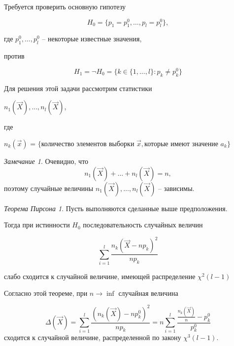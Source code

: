 \documentclass[a4paper, 12pt]{article}
\theoremstyle{definition}
\theoremstyle{leads}
\theoremstyle{example}
\theoremstyle{remark}
\newtheorem{remark}{Замечание}
\begin{document}
Требуется проверить основную гипотезу

\begin{equation*}
	H_0 = \{p_1 = p_1^0, \dots, p_l = p_l^0\}, 
\end{equation*}

где $p_1^0, \dots, p_l^0$ -- некоторые известные значения,

против

\begin{equation*}
	H_1 = \neg H_0 = \{k \in \{1, \dots, l\} : p_k \neq p_k^0\} 
\end{equation*}

Для решения этой задачи рассмотрим статистики
\begin{center}
	\centering
	$n_1(\vec{X}), \dots, n_l(\vec{X})$,
\end{center}

где 

 $n_k(\vec{x})$ = $\{\text{количество элементов выборки  } \vec{x}, \text{которые имеют значение  } a_k \}$

\begin{remark}
	Очевидно, что 
	\begin{equation*}
		n_1(\vec{X}) + \dots + n_l(\vec{X}) = n,
	\end{equation*}
	поэтому случайные величины $n_1(\vec{X}), \dots, n_l(\vec{X})$ -- зависимы.
\end{remark}

\newtheorem*{Piersonn}{Теорема Пирсона}
\begin{Piersonn}
Пусть выполняются сделанные выше предположения.

Тогда при истинности $H_0$ последовательность случайных величин

\begin{center}
	\centering
	$$\sum_{i=1}^{l} \frac{n_k(\vec{X} - np_k)^2}{n p_k}$$
\end{center}

слабо сходится к случайной величине, имеющей распределение $\chi^2(l - 1)$
\end{Piersonn}

Согласно этой теореме, при $n \longrightarrow \inf$ случайная величина

\begin{equation*}
	\Delta(\vec{X}) = \sum_{i=1}^{l} \frac{(n_k(\vec{X}) - n p_k^0)^2}{n p_k} = n \sum_{i=1}^{l} \frac{\frac{n_k(\vec{X})}{n} - p_k^0}{p_k^0}
\end{equation*}
сходится к случайной величине, распределенной по закону $\chi^3(l - 1)$.
\end{document}
